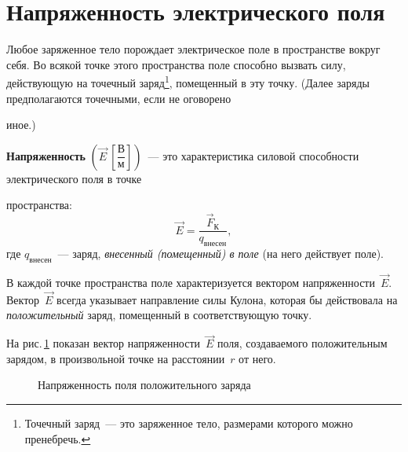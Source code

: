 \documentclass[main.tex]{subfiles}
\begin{document}

 

 

 
   

\section{Напряженность электрического поля}




Любое заряженное тело порождает электрическое поле в пространстве вокруг себя. Во всякой точке этого пространства поле способно вызвать силу, действующую на точечный заряд\footnote{Точечный заряд~--- это заряженное тело, размерами которого можно пренебречь.}, помещенный в эту точку. 
(Далее заряды предполагаются точечными, если не оговорено \strut иное.)

\textbf{Напряженность} $\left(\vec E\ \left[\dfrac{\text{В}}{\text{м}}\right]\right)$~--- это характеристика силовой способности электрического поля в точке \strut пространства:
\begin{equation}
    \label{6E_e1}
    \vec E=\frac{\vec F_\text{К}}{q_\text{внесен}},
\end{equation}
где $q_\text{внесен}$~--- заряд, \emph{внесенный (помещенный) в поле} (на него действует поле).

В каждой точке пространства поле характеризуется вектором напряженности~$\vec E$. Вектор~$\vec E$ всегда указывает направление силы Кулона, которая бы действовала на \emph{положительный} заряд, помещенный в соответствующую точку.

На рис.\,\ref{fig:p98} показан вектор напряженности~$\vec E$ поля, создаваемого положительным зарядом, в произвольной точке на расстоянии~$r$ от него. 

    \begin{figure}[H]
    \centering

\caption{Напряженность поля положительного заряда}
\label{fig:p98}
\end{figure}
\end{document}
